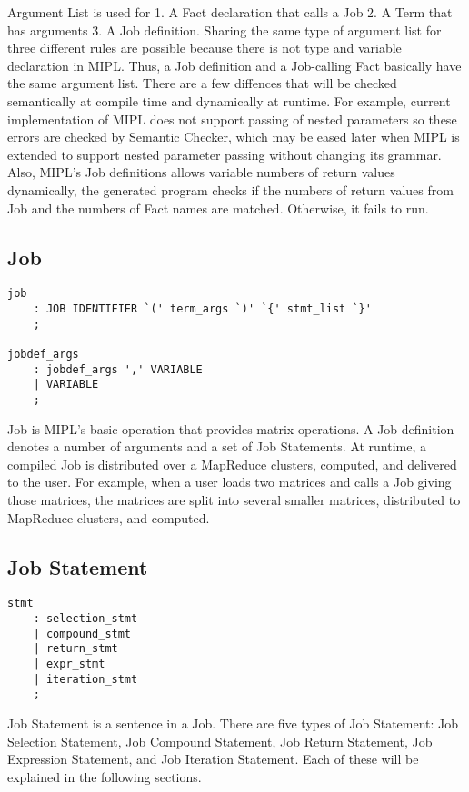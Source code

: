 \documentclass[prodmode,acmtecs]{acmsmall}
\begin{document}
Argument List is used for 1. A Fact declaration that calls a Job
2. A Term that has arguments 3. A Job definition.  Sharing the
same type of argument list for three different rules are possible
because there is not type and variable declaration in MIPL.  Thus,
a Job definition and a Job-calling Fact basically have the same
argument list.  There are a few diffences that will be checked
semantically at compile time and dynamically at runtime.  For example,
current implementation of MIPL does not support passing of nested
parameters so these errors are checked by Semantic Checker, which may
be eased later when MIPL is extended to support nested parameter passing
without changing its grammar.  Also, MIPL's Job definitions allows
variable numbers of return values dynamically, the generated program
checks if the numbers of return values from Job and the numbers of
Fact names are matched.  Otherwise, it fails to run.
\medskip

\subsection{Job}

\begin{lstlisting}
job
	: JOB IDENTIFIER `(' term_args `)' `{' stmt_list `}'
	;

jobdef_args
	: jobdef_args ',' VARIABLE
	| VARIABLE
	;
\end{lstlisting}

\label{Job_Section}
Job is MIPL's basic operation that provides matrix operations.
A Job definition denotes a number of arguments and a set of Job
Statements.  At runtime, a compiled Job is distributed over
a MapReduce clusters, computed, and delivered to the user. For
example, when a user loads two matrices and calls a Job giving those
matrices, the matrices are split into several smaller matrices,
distributed to MapReduce clusters, and computed.
\medskip

\subsection{Job Statement}

\begin{lstlisting}
stmt
	: selection_stmt
	| compound_stmt
	| return_stmt
	| expr_stmt
	| iteration_stmt
	;
\end{lstlisting}

Job Statement is a sentence in a Job.  There are five types of
Job Statement: Job Selection Statement, Job Compound Statement,
Job Return Statement, Job Expression Statement, and Job Iteration
Statement.  Each of these will be explained in the following
sections.
\medskip
\end{document}
